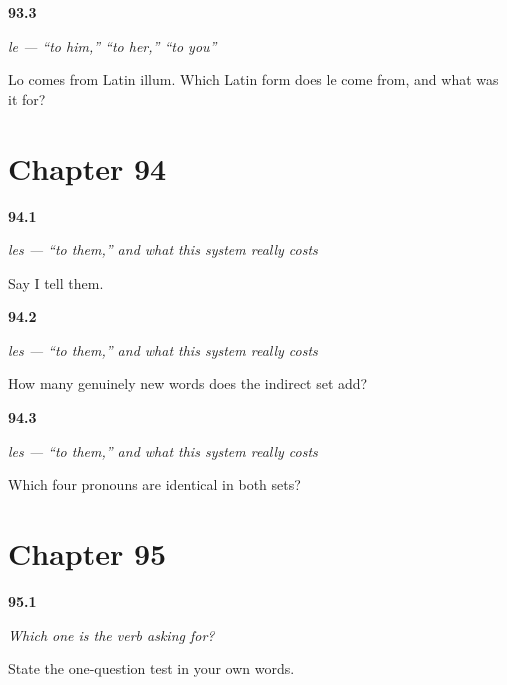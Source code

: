 \noindent\begin{minipage}[t]{\linewidth}
\raggedright
\hypertarget{review-ES-C46-le-case}{\textbf{93.3}} \emph{le — \textquotedblleft{}to him,\textquotedblright{} \textquotedblleft{}to her,\textquotedblright{} \textquotedblleft{}to you\textquotedblright{}}\par
\small Lo comes from Latin illum. Which Latin form does le come from, and what was it for?
\end{minipage}\par\medskip

\section*{Chapter 94}

\noindent\begin{minipage}[t]{\linewidth}
\raggedright
\hypertarget{review-ES-C46-les-say}{\textbf{94.1}} \emph{les — \textquotedblleft{}to them,\textquotedblright{} and what this system really costs}\par
\small Say I tell them.
\end{minipage}\par\medskip

\noindent\begin{minipage}[t]{\linewidth}
\raggedright
\hypertarget{review-ES-C46-les-count}{\textbf{94.2}} \emph{les — \textquotedblleft{}to them,\textquotedblright{} and what this system really costs}\par
\small How many genuinely new words does the indirect set add?
\end{minipage}\par\medskip

\noindent\begin{minipage}[t]{\linewidth}
\raggedright
\hypertarget{review-ES-C46-les-same}{\textbf{94.3}} \emph{les — \textquotedblleft{}to them,\textquotedblright{} and what this system really costs}\par
\small Which four pronouns are identical in both sets?
\end{minipage}\par\medskip

\section*{Chapter 95}

\noindent\begin{minipage}[t]{\linewidth}
\raggedright
\hypertarget{review-ES-C46-cual-pide-test}{\textbf{95.1}} \emph{Which one is the verb asking for?}\par
\small State the one-question test in your own words.
\end{minipage}\par\medskip

